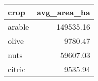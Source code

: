 
\begin{tabular}{lr}
  \hline
  crop   & avg\_area\_ha \\
  \hline
  arable & 149535.16     \\
  olive  & 9780.47       \\
  nuts   & 59607.03      \\
  citric & 9535.94       \\
  \hline
\end{tabular}

